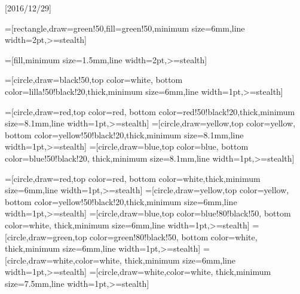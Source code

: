 
\usepackage{scalerel}[2016/12/29] %

\usepackage{tikz}
\usetikzlibrary{arrows,shapes,backgrounds,through,shadows,positioning}
\usetikzlibrary{decorations.pathmorphing}
\usetikzlibrary{calc}
\usetikzlibrary{fit} %
\usetikzlibrary{graphs,graphs.standard}
\usepackage{pgfplots}
\usetikzlibrary{tikzmark,positioning}

=[rectangle,draw=green!50,fill=green!50,minimum size=6mm,line width=2pt,>=stealth]  %

\newcommand{\betadist}[3]{B\br{#1|#2,#3}}

=[fill,minimum size=1.5mm,line width=2pt,>=stealth]

=[circle,draw=black!50,top color=white, %
bottom color=lilla!50!black!20,thick,minimum size=6mm,line width=1pt,>=stealth]  %

=[circle,draw=red,top color=red, %
bottom color=red!50!black!20,thick,minimum size=8.1mm,line width=1pt,>=stealth]  %
=[circle,draw=yellow,top color=yellow, %
bottom color=yellow!50!black!20,thick,minimum size=8.1mm,line width=1pt,>=stealth]  %
=[circle,draw=blue,top color=blue, %
bottom color=blue!50!black!20, thick,minimum size=8.1mm,line width=1pt,>=stealth]  %

=[circle,draw=red,top color=red, %
bottom color=white,thick,minimum size=6mm,line width=1pt,>=stealth]  %
=[circle,draw=yellow,top color=yellow, %
bottom color=yellow!50!black!20,thick,minimum size=6mm,line width=1pt,>=stealth]  %
=[circle,draw=blue,top color=blue!80!black!50, %
bottom color=white, thick,minimum size=6mm,line width=1pt,>=stealth]  %
=[circle,draw=green,top color=green!80!black!50, %
bottom color=white, thick,minimum size=6mm,line width=1pt,>=stealth]  %
=[circle,draw=white,color=white, thick,minimum size=6mm,line width=1pt,>=stealth]  %
=[circle,draw=white,color=white, thick,minimum size=7.5mm,line width=1pt,>=stealth]  %

